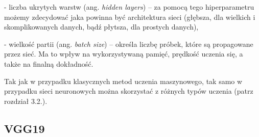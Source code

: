 - liczba ukrytych warstw (ang. \textit{hidden layers}) – za pomocą tego hiperparametru możemy zdecydować jaka powinna być architektura sieci (głębsza, dla wielkich i skomplikowanych danych, bądź płytsza, dla prostych danych),

- wielkość partii (ang. \textit{batch size}) – określa liczbę próbek, które są propagowane przez sieć. Ma to wpływ na wykorzystywaną pamięć, prędkość uczenia się, a także na finalną dokładność. 

\noindent Tak jak w przypadku klasycznych metod uczenia maszynowego, tak samo w przypadku sieci neuronowych można skorzystać z różnych typów uczenia (patrz rozdział 3.2.). 

\subsection{VGG19}
\label{cha:VGG19}



































































